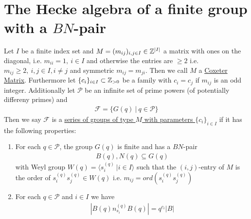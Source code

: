 \documentclass[]{article}
\begin{document}
\section{The Hecke algebra of a finite group with a \(BN\)-pair}
\setcounter{theorem}{6}
\begin{definition}
    Let \(I\) be a finite index set and \(M=(m_{ij})_{i,j \in I} \in {\mathbb{Z}}^{|I|}\) a matrix with ones on the diagonal, 
    i.e. \(m_{ii}=1,\ i \in I\) and otherwise the entries are \(\geq 2\) i.e. \(m_{ij} \geq 2, \ i, j \in I, i \neq j\)
    and symmetric \(m_{ij}=m_{ji}\). Then we call \(M\) a \underline{Coxeter Matrix}. Furthermore let 
    \(\{c_i\}_{i \in I} \subset {\mathbb{Z}}_{>0}\) be a family with \(c_i = c_j\) if \(m_{ij}\) is an odd integer. 
    Additionally let \(\mathscr{P}\) be an infinite set of prime powers (of potentially differeny primes) and 
    \begin{align*}
        \mathscr{F}=\{G(q) \ | \ q \in \mathscr{P}\}
    \end{align*}
    Then we say \(\mathscr{F}\) is a \underline{series of groups of type \(M\) with parameters \(\{c_i\}_{i \in I}\)}
    if it has the following properties:
    \begin{enumerate}
        \item For each \(q \in \mathscr{P}\), the group \(G(q)\) is finite and has a \(BN\)-pair 
        \begin{align*}
            B(q), N(q) \subseteq G(q)
        \end{align*}
        with Weyl group \(W(q)=\langle s_i^{(q)} \ | i \in I \rangle\) such 
        that the \((i,j)\)-entry of \(M\) is the order of \(s_i^{(q)} s_j^{(q)} \in W(q)\) i.e. \(m_{ij}=ord(s_i^{(q)}s_j^{(q)})\)
        \item For each \(q \in \mathscr{P}\) and \(i \in I\) we have 
        \begin{align*}
            |B(q) n_{s_i}^{(q)} B(q) | = q^{c_i} | B |
        \end{align*}
        \label{qci}
    \end{enumerate}
    \label{series of type M}
\end{definition}
\end{document}
